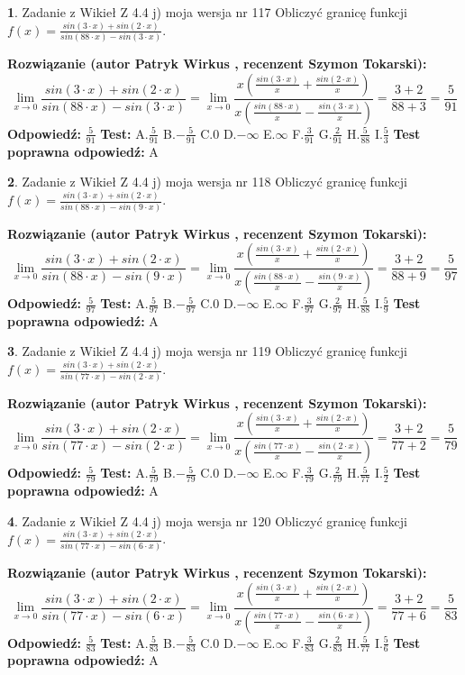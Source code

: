 \documentclass[12pt, a4paper]{article}
\theoremstyle{definition} %
\newtheorem{zad}{}
\newcommand{\zadStart}[1]{\begin{zad}#1\newline}
\newcommand{\zadStop}{\end{zad}}
\newcommand{\rozwStart}[2]{\noindent \textbf{Rozwiązanie (autor #1 , recenzent #2): }\newline}
\newcommand{\rozwStop}{\newline}
\newcommand{\odpStart}{\noindent \textbf{Odpowiedź:}\newline}
\newcommand{\odpStop}{\newline}
\newcommand{\testStart}{\noindent \textbf{Test:}\newline}
\newcommand{\testStop}{\newline}
\newcommand{\kluczStart}{\noindent \textbf{Test poprawna odpowiedź:}\newline}
\newcommand{\kluczStop}{\newline}
\begin{document}
\zadStart{Zadanie z Wikieł Z 4.4 j) moja wersja nr 117}
Obliczyć granicę funkcji $f(x)=\frac{sin(3\cdot x) +sin(2\cdot x)}{sin(88\cdot x) -sin(3\cdot x)}$.
\zadStop
\rozwStart{Patryk Wirkus}{Szymon Tokarski}
$$\lim\limits_{x\to 0}\frac{sin(3\cdot x) +sin(2\cdot x)}{sin(88\cdot x) -sin(3\cdot x)}=\lim\limits_{x\to 0}\frac{x(\frac{sin(3\cdot x)}{x}+\frac{sin(2\cdot x)}{x})}{x(\frac{sin(88\cdot x)}{x}-\frac{sin(3\cdot x)}{x})}=\frac{3+2}{88+3} = \frac{5}{91}$$
\rozwStop
\odpStart
$\frac{5}{91}$
\odpStop
\testStart
A.$\frac{5}{91}$
B.$-\frac{5}{91}$
C.$0$
D.$-\infty$
E.$\infty$
F.$\frac{3}{91}$
G.$\frac{2}{91}$
H.$\frac{5}{88}$
I.$\frac{5}{3}$
\testStop
\kluczStart
A
\kluczStop



\zadStart{Zadanie z Wikieł Z 4.4 j) moja wersja nr 118}
Obliczyć granicę funkcji $f(x)=\frac{sin(3\cdot x) +sin(2\cdot x)}{sin(88\cdot x) -sin(9\cdot x)}$.
\zadStop
\rozwStart{Patryk Wirkus}{Szymon Tokarski}
$$\lim\limits_{x\to 0}\frac{sin(3\cdot x) +sin(2\cdot x)}{sin(88\cdot x) -sin(9\cdot x)}=\lim\limits_{x\to 0}\frac{x(\frac{sin(3\cdot x)}{x}+\frac{sin(2\cdot x)}{x})}{x(\frac{sin(88\cdot x)}{x}-\frac{sin(9\cdot x)}{x})}=\frac{3+2}{88+9} = \frac{5}{97}$$
\rozwStop
\odpStart
$\frac{5}{97}$
\odpStop
\testStart
A.$\frac{5}{97}$
B.$-\frac{5}{97}$
C.$0$
D.$-\infty$
E.$\infty$
F.$\frac{3}{97}$
G.$\frac{2}{97}$
H.$\frac{5}{88}$
I.$\frac{5}{9}$
\testStop
\kluczStart
A
\kluczStop



\zadStart{Zadanie z Wikieł Z 4.4 j) moja wersja nr 119}
Obliczyć granicę funkcji $f(x)=\frac{sin(3\cdot x) +sin(2\cdot x)}{sin(77\cdot x) -sin(2\cdot x)}$.
\zadStop
\rozwStart{Patryk Wirkus}{Szymon Tokarski}
$$\lim\limits_{x\to 0}\frac{sin(3\cdot x) +sin(2\cdot x)}{sin(77\cdot x) -sin(2\cdot x)}=\lim\limits_{x\to 0}\frac{x(\frac{sin(3\cdot x)}{x}+\frac{sin(2\cdot x)}{x})}{x(\frac{sin(77\cdot x)}{x}-\frac{sin(2\cdot x)}{x})}=\frac{3+2}{77+2} = \frac{5}{79}$$
\rozwStop
\odpStart
$\frac{5}{79}$
\odpStop
\testStart
A.$\frac{5}{79}$
B.$-\frac{5}{79}$
C.$0$
D.$-\infty$
E.$\infty$
F.$\frac{3}{79}$
G.$\frac{2}{79}$
H.$\frac{5}{77}$
I.$\frac{5}{2}$
\testStop
\kluczStart
A
\kluczStop



\zadStart{Zadanie z Wikieł Z 4.4 j) moja wersja nr 120}
Obliczyć granicę funkcji $f(x)=\frac{sin(3\cdot x) +sin(2\cdot x)}{sin(77\cdot x) -sin(6\cdot x)}$.
\zadStop
\rozwStart{Patryk Wirkus}{Szymon Tokarski}
$$\lim\limits_{x\to 0}\frac{sin(3\cdot x) +sin(2\cdot x)}{sin(77\cdot x) -sin(6\cdot x)}=\lim\limits_{x\to 0}\frac{x(\frac{sin(3\cdot x)}{x}+\frac{sin(2\cdot x)}{x})}{x(\frac{sin(77\cdot x)}{x}-\frac{sin(6\cdot x)}{x})}=\frac{3+2}{77+6} = \frac{5}{83}$$
\rozwStop
\odpStart
$\frac{5}{83}$
\odpStop
\testStart
A.$\frac{5}{83}$
B.$-\frac{5}{83}$
C.$0$
D.$-\infty$
E.$\infty$
F.$\frac{3}{83}$
G.$\frac{2}{83}$
H.$\frac{5}{77}$
I.$\frac{5}{6}$
\testStop
\kluczStart
A
\kluczStop
\end{document}

